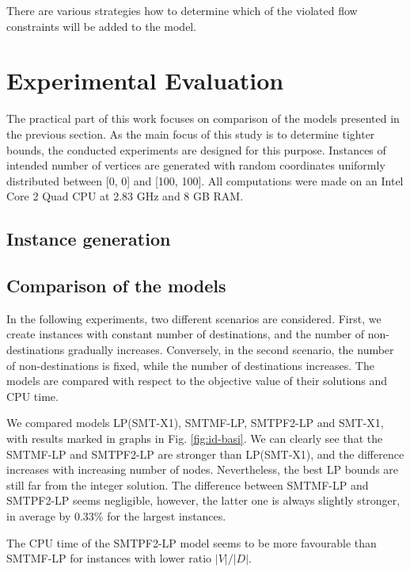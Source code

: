 There are various strategies how to determine which of the violated flow constraints will be added to the model. 


\section{Experimental Evaluation}
\label{sec:exp}

The practical part of this work focuses on comparison of the models presented in the previous section. As the main focus of this study is to determine tighter bounds, the conducted experiments are designed for this purpose. Instances of intended number of vertices are generated with random coordinates uniformly distributed between [0, 0] and [100, 100]. All computations were made on an Intel Core 2 Quad CPU at 2.83 GHz and 8 GB RAM.

\subsection{Instance generation}


\subsection{Comparison of the models}
\label{sec:conclusion}
In the following experiments, two different scenarios are considered. First, we create instances with constant number of destinations, and the number of non-destinations gradually increases. Conversely, in the second scenario, the number of non-destinations is fixed, while the number of destinations increases. The models are compared with respect to the objective value of their solutions and CPU time.

We compared models LP(SMT-X1), SMTMF-LP, SMTPF2-LP and SMT-X1, with results marked in graphs in Fig. \ref{fig:id-basi}. We can clearly see that the SMTMF-LP and SMTPF2-LP are stronger than LP(SMT-X1), and the difference increases with increasing number of nodes. Nevertheless, the best LP bounds are still far from the integer solution. The difference between SMTMF-LP and SMTPF2-LP seems negligible, however, the latter one is always slightly stronger, in average by 0.33\% for the largest instances. 

The CPU time of the SMTPF2-LP model seems to be more favourable than SMTMF-LP for instances with lower ratio $|V|/|D|$. 



